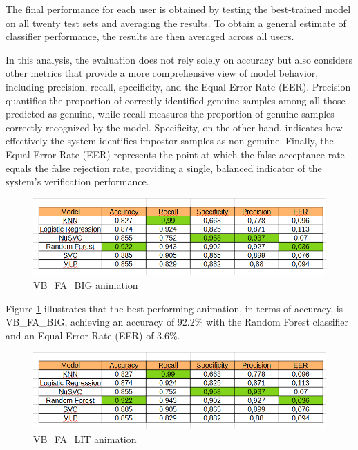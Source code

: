 \documentclass{article}
\begin{document}
The final performance for each user is obtained by testing the best-trained model on all twenty test sets and averaging the results.
To obtain a general estimate of classifier performance, the results are then averaged across all users.

In this analysis, the evaluation does not rely solely on accuracy but also considers other metrics that provide a more comprehensive view of model behavior, including precision, recall, specificity, and the Equal Error Rate (EER).
Precision quantifies the proportion of correctly identified genuine samples among all those predicted as genuine, while recall measures the proportion of genuine samples correctly recognized by the model.
Specificity, on the other hand, indicates how effectively the system identifies impostor samples as non-genuine.
Finally, the Equal Error Rate (EER) represents the point at which the false acceptance rate equals the false rejection rate, providing a single, balanced indicator of the system's verification performance.

\begin{figure}[ht]
    \centering
    \includegraphics[width = 0.8
    \textwidth]{Images/Results/Verification_single/st/VB_FA_BIG.png}
    \caption{VB\_FA\_BIG animation}
    \label{fig:VB_FA_BIG_st}
\end{figure}

Figure \ref{fig:VB_FA_BIG_st} illustrates that the best-performing animation, in terms of accuracy, is VB\_FA\_BIG, achieving an accuracy of 92.2\% with the Random Forest classifier and an Equal Error Rate (EER) of 3.6\%.

\begin{figure}[ht]
    \centering
    \includegraphics[width = 0.8
    \textwidth]{Images/Results/Verification_single/st/VB_FA_BIG.png}
    \caption{VB\_FA\_LIT animation}
    \label{fig:VB_FA_LIT_st}
\end{figure}
\end{document}
